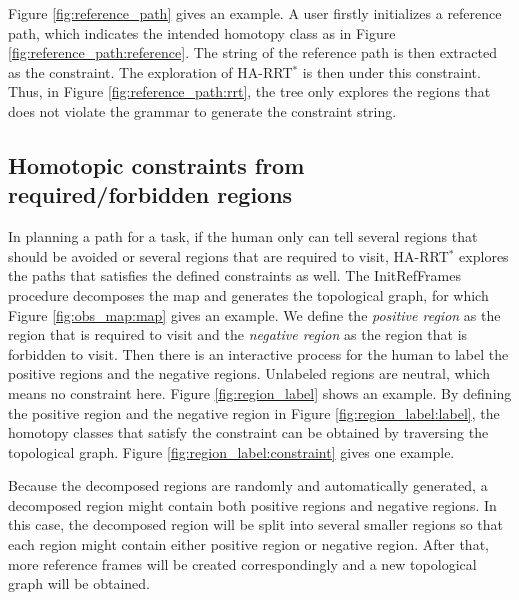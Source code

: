 \documentclass[letterpaper, 10 pt, conference]{ieeeconf}
\begin{document}
Figure \ref{fig:reference_path} gives an example.
A user firstly initializes a reference path, which indicates the intended homotopy class as in Figure \ref{fig:reference_path:reference}.
The string of the reference path is then extracted as the constraint.
The exploration of HA-RRT$^{*}$ is then under this constraint.
Thus, in Figure \ref{fig:reference_path:rrt}, the tree only explores the regions that does not violate the grammar to generate the constraint string.

\subsection{Homotopic constraints from required/forbidden regions}

In planning a path for a task, if the human only can tell several regions that should be avoided or several regions that are required to visit, HA-RRT$^{*}$ explores the paths that satisfies the defined constraints as well.
The {\sc InitRefFrames} procedure decomposes the map and generates the topological graph, for which Figure \ref{fig:obs_map:map} gives an example.
We define the \emph{positive region} as the region that is required to visit and the \emph{negative region} as the region that is forbidden to visit.
Then there is an interactive process for the human to label the positive regions and the negative regions.
Unlabeled regions are neutral, which means no constraint here.
Figure \ref{fig:region_label} shows an example.
By defining the positive region and the negative region in Figure \ref{fig:region_label:label}, the homotopy classes that satisfy the constraint can be obtained by traversing the topological graph.
Figure \ref{fig:region_label:constraint} gives one example.

Because the decomposed regions are randomly and automatically generated, a decomposed region might contain both positive regions and negative regions.
In this case, the decomposed region will be split into several smaller regions so that each region might contain either positive region or negative region.
After that, more reference frames will be created correspondingly and a new topological graph will be obtained.
\end{document}
